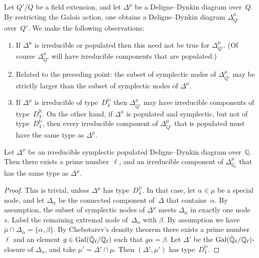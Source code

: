 \documentclass[10pt,twoside,leqno]{article}
\numberwithin{equation}{subsection}
\newcommand{\QQ}{\mathbb{Q}}
\newcommand{\QQbar}{\bar{\QQ}}
\newcommand{\QQl}{\QQ_{\ell}}
\newcommand{\QQlbar}{\QQbar_{\ell}}
\newcommand{\RR}{\mathbb{R}}
\newcommand{\HQ}{\mathbb{H}}
\newcommand{\Gal}{\textnormal{Gal}}
\begin{document}
\begin{remark} %
 \label{type-remarks}
 Let $Q'/Q$ be a field extension,
 and let $\Delta^{\mu}$ be a Deligne--Dynkin diagram over~$Q$.
 By restricting the Galois action,
 one obtains a Deligne--Dynkin diagram $\Delta^{\mu}_{Q'}$ over~$Q'$.
 We make the following observations:
 \begin{enumerate}
  \item If $\Delta^{\mu}$ is irreducible or populated
   then this need not be true for $\Delta^{\mu}_{Q'}$.
   (Of course $\Delta^\mu_{Q'}$ will have
   irreducible components that are populated.)
  \item Related to the preceding point:
   the subset of symplectic nodes of $\Delta^{\mu}_{Q'}$
   may be strictly larger than the subset of symplectic nodes of $\Delta^{\mu}$.
  \item If $\Delta^{\mu}$ is irreducible of type~$D_4^\HQ$
   then $\Delta^{\mu}_{Q'}$ may have irreducible components of type~$D_4^\RR$.
   On the other hand, if $\Delta^{\mu}$ is populated and symplectic,
   but not of type~$D_4^\HQ$,
   then every irreducible component of $\Delta^{\mu}_{Q'}$ that is populated
   must have the same type as $\Delta^{\mu}$.
 \end{enumerate}
\end{remark}

\begin{lemma} %
 \label{locally-same-type}
 Let $\Delta^{\mu}$ be
 an irreducible symplectic populated Deligne--Dynkin diagram over~$\QQ$.
 Then there exists a prime number~$\ell$,
 and an irreducible component of $\Delta^{\mu}_{\QQl}$
 that has the same type as $\Delta^{\mu}$.
 \begin{proof}
  This is trivial, unless $\Delta^{\mu}$ has type~$D_4^\HQ$.
  In that case, let $\alpha \in \mu$ be a special node,
  and let $\Delta_\alpha$ be
  the connected component of~$\Delta$ that contains~$\alpha$.
  By assumption, the subset of symplectic nodes of $\Delta^{\mu}$
  meets $\Delta_\alpha$ in exactly one node~$s$.
  Label the remaining extremal node of~$\Delta_\alpha$ with $\beta$.
  By assumption we have $\bar\mu \cap \Delta_\alpha = \{\alpha,\beta\}$.
  By Chebotarev's density theorem
  there exists a prime number~$\ell$
  and an element $g \in \Gal(\QQlbar/\QQl)$ such that $g\alpha = \beta$.
  Let $\Delta'$ be the $\Gal(\QQlbar/\QQl)$-closure of $\Delta_\alpha$,
  and take $\mu' = \Delta' \cap \mu$.
  Then $(\Delta', \mu')$ has type~$D_4^\HQ$.
 \end{proof}
\end{lemma}
\end{document}
